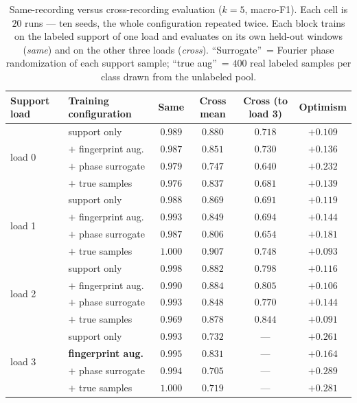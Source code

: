 \documentclass[journal]{IEEEtran}
\begin{document}
\begin{table}[t]
\centering
\caption{Same-recording versus cross-recording evaluation ($k=5$, macro-F1).
Each cell is $20$ runs --- ten seeds, the whole configuration repeated twice.
Each block trains on the labeled support of one load and evaluates
on its own held-out windows (\emph{same}) and on the other three loads
(\emph{cross}). ``Surrogate''\ = Fourier phase randomization of each support
sample; ``true aug''\ = $400$ real labeled samples per class drawn from the
unlabeled pool.}
\label{tab:leak}
\small
\begin{tabular}{llcccc}
\toprule
Support load & Training configuration & Same & Cross mean & Cross (to load 3) & Optimism \\
\midrule
\multirow{4}{*}{load 0}
 & support only             & $0.989$ & $0.880$ & $0.718$ & $+0.109$ \\
 & $+$ fingerprint aug.     & $0.987$ & $0.851$ & $0.730$ & $+0.136$ \\
 & $+$ phase surrogate      & $0.979$ & $0.747$ & $0.640$ & $+0.232$ \\
 & $+$ true samples         & $0.976$ & $0.837$ & $0.681$ & $+0.139$ \\
\midrule
\multirow{4}{*}{load 1}
 & support only             & $0.988$ & $0.869$ & $0.691$ & $+0.119$ \\
 & $+$ fingerprint aug.     & $0.993$ & $0.849$ & $0.694$ & $+0.144$ \\
 & $+$ phase surrogate      & $0.987$ & $0.806$ & $0.654$ & $+0.181$ \\
 & $+$ true samples         & $1.000$ & $0.907$ & $0.748$ & $+0.093$ \\
\midrule
\multirow{4}{*}{load 2}
 & support only             & $0.998$ & $0.882$ & $0.798$ & $+0.116$ \\
 & $+$ fingerprint aug.     & $0.990$ & $0.884$ & $0.805$ & $+0.106$ \\
 & $+$ phase surrogate      & $0.993$ & $0.848$ & $0.770$ & $+0.144$ \\
 & $+$ true samples         & $0.969$ & $0.878$ & $0.844$ & $+0.091$ \\
\midrule
\multirow{4}{*}{load 3}
 & support only             & $0.993$ & $0.732$ & --- & $+0.261$ \\
 & \textbf{fingerprint aug.} & $0.995$ & $\mathbf{0.831}$ & --- & $+0.164$ \\
 & $+$ phase surrogate      & $0.994$ & $0.705$ & --- & $+0.289$ \\
 & $+$ true samples         & $1.000$ & $0.719$ & --- & $+0.281$ \\

\end{tabular}
\end{table}
\end{document}
